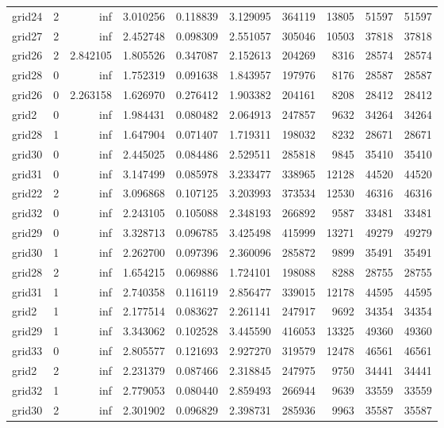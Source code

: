 \begin{longtable}{|l|r|r|r|r|r|r|r|r|r|}
grid24 & 2 & inf & 3.010256 & 0.118839 & 3.129095 & 364119 & 13805 & 51597 & 51597 \\
grid27 & 2 & inf & 2.452748 & 0.098309 & 2.551057 & 305046 & 10503 & 37818 & 37818 \\
grid26 & 2 & 2.842105 & 1.805526 & 0.347087 & 2.152613 & 204269 & 8316 & 28574 & 28574 \\
grid28 & 0 & inf & 1.752319 & 0.091638 & 1.843957 & 197976 & 8176 & 28587 & 28587 \\
grid26 & 0 & 2.263158 & 1.626970 & 0.276412 & 1.903382 & 204161 & 8208 & 28412 & 28412 \\
grid2 & 0 & inf & 1.984431 & 0.080482 & 2.064913 & 247857 & 9632 & 34264 & 34264 \\
grid28 & 1 & inf & 1.647904 & 0.071407 & 1.719311 & 198032 & 8232 & 28671 & 28671 \\
grid30 & 0 & inf & 2.445025 & 0.084486 & 2.529511 & 285818 & 9845 & 35410 & 35410 \\
grid31 & 0 & inf & 3.147499 & 0.085978 & 3.233477 & 338965 & 12128 & 44520 & 44520 \\
grid22 & 2 & inf & 3.096868 & 0.107125 & 3.203993 & 373534 & 12530 & 46316 & 46316 \\
grid32 & 0 & inf & 2.243105 & 0.105088 & 2.348193 & 266892 & 9587 & 33481 & 33481 \\
grid29 & 0 & inf & 3.328713 & 0.096785 & 3.425498 & 415999 & 13271 & 49279 & 49279 \\
grid30 & 1 & inf & 2.262700 & 0.097396 & 2.360096 & 285872 & 9899 & 35491 & 35491 \\
grid28 & 2 & inf & 1.654215 & 0.069886 & 1.724101 & 198088 & 8288 & 28755 & 28755 \\
grid31 & 1 & inf & 2.740358 & 0.116119 & 2.856477 & 339015 & 12178 & 44595 & 44595 \\
grid2 & 1 & inf & 2.177514 & 0.083627 & 2.261141 & 247917 & 9692 & 34354 & 34354 \\
grid29 & 1 & inf & 3.343062 & 0.102528 & 3.445590 & 416053 & 13325 & 49360 & 49360 \\
grid33 & 0 & inf & 2.805577 & 0.121693 & 2.927270 & 319579 & 12478 & 46561 & 46561 \\
grid2 & 2 & inf & 2.231379 & 0.087466 & 2.318845 & 247975 & 9750 & 34441 & 34441 \\
grid32 & 1 & inf & 2.779053 & 0.080440 & 2.859493 & 266944 & 9639 & 33559 & 33559 \\
grid30 & 2 & inf & 2.301902 & 0.096829 & 2.398731 & 285936 & 9963 & 35587 & 35587 \\

\end{longtable}
